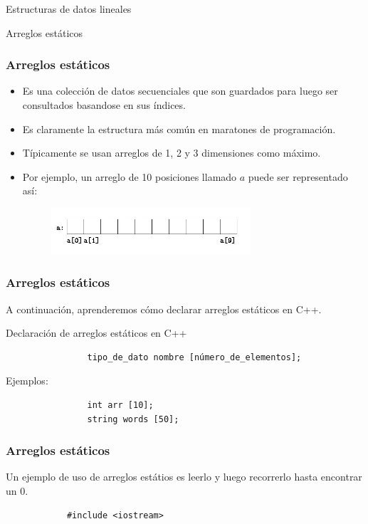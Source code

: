 \documentclass{beamer}
\begin{document}
\begin{section}{Estructuras de datos lineales}

\begin{subsection}{Arreglos estáticos}
	\begin{frame}[fragile]
		\frametitle{Arreglos estáticos}
		\begin{itemize}
			\item{Es una colección de datos secuenciales que son guardados para luego ser consultados basandose en sus índices.}
			\item{Es claramente la estructura más común en maratones de programación.}
			\item{Típicamente se usan arreglos de 1, 2 y 3 dimensiones como máximo.}
			\item{Por ejemplo, un arreglo de 10 posiciones llamado $a$ puede ser representado así:}
			\begin{figure}
				\includegraphics[width = 0.7\textwidth]{src/arreglo.jpg}
			\end{figure}			
		\end{itemize}
	\end{frame}
	
	\begin{frame}[fragile]
		\frametitle{Arreglos estáticos}
		A continuación, aprenderemos cómo declarar arreglos estáticos en C++.
		\begin{block}{Declaración de arreglos estáticos en C++}
			\begin{verbatim}
				tipo_de_dato nombre [número_de_elementos];
			\end{verbatim}
			Ejemplos:\\
			\begin{verbatim}
				int arr [10];
				string words [50];
			\end{verbatim}			
		\end{block}		
	\end{frame}
	
	\begin{frame}[fragile]
		\frametitle{Arreglos estáticos}
		\small{Un ejemplo de uso de arreglos estátios es leerlo y luego recorrerlo hasta encontrar un 0.}
		\begin{lstlisting}
			#include <iostream>
			

\end{lstlisting}
\end{frame}
\end{subsection}
\end{section}
\end{document}
